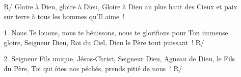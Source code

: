 \begin{itemize}
\item[R/]  Gloire à Dieu, gloire à Dieu, Gloire à Dieu au plus haut des Cieux 
     et paix sur terre à tous les hommes qu’Il aime !
\item[1.]  Nous Te louons, nous te bénissons, nous te glorifions pour Ton immense 
     gloire, Seigneur Dieu, Roi du Ciel, Dieu le Père tout puissant ! R/
\item[2.] 
Seigneur Fils unique, Jésus-Christ, Seigneur Dieu, Agneau de Dieu, le Fils du 
     Père, Toi qui ôtes nos péchés, prends pitié de nous ! R/
\end{itemize}

